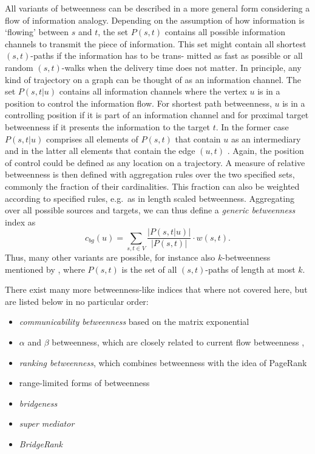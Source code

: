 \documentclass[]{book}
\providecommand{\tightlist}{%
  \setlength{\itemsep}{0pt}\setlength{\parskip}{0pt}}
\theoremstyle{definition}
\theoremstyle{definition}
\theoremstyle{definition}
\theoremstyle{remark}
\begin{document}
All variants of betweenness can be described in a more general form
considering a flow of information analogy. Depending on the assumption
of how information is `flowing' between \(s\) and \(t\), the set
\(P(s, t)\) contains all possible information channels to transmit the
piece of information. This set might contain all shortest
\(( s, t )\)-paths if the information has to be trans- mitted as fast as
possible or all random \((s, t)\)-walks when the delivery time does not
matter. In principle, any kind of trajectory on a graph can be thought
of as an information channel. The set \(P( s, t \lvert u )\) contains
all information channels where the vertex \(u\) is in a position to
control the information flow. For shortest path betweenness, \(u\) is in
a controlling position if it is part of an information channel and for
proximal target betweenness if it presents the information to the target
\(t\). In the former case \(P( s, t \lvert u )\) comprises all elements
of \(P(s, t)\) that contain \(u\) as an intermediary and in the latter
all elements that contain the edge \((u,t)\) . Again, the position of
control could be defined as any location on a trajectory. A measure of
relative betweenness is then defined with aggregation rules over the two
specified sets, commonly the fraction of their cardinalities. This
fraction can also be weighted according to specified rules, e.g.~as in
length scaled betweenness. Aggregating over all possible sources and
targets, we can thus define a \emph{generic betweenness} index as \[
c_{bg}(u) = \sum\limits_{s,t \in V}\frac{\lvert P(s,t\lvert u) \rvert}{\lvert P(s,t) \rvert} \cdot w(s,t).
\] Thus, many other variants are possible, for instance also
\(k\)-betweenness mentioned by \citet{be-gpc-06}, where \(P( s, t )\) is
the set of all \(( s, t )\)-paths of length at most \(k\).

There exist many more betweenness-like indices that where not covered
here, but are listed below in no particular order:

\begin{itemize}
\tightlist
\item
  \emph{communicability betweenness} based on the matrix exponential
  \citep{ehh-cbcn-09}
\item
  \(\alpha\) and \(\beta\) betweenness, which are closely related to
  current flow betweenness \citep{alms-acfbc-13, amt-bcfcwn-15},
\item
  \emph{ranking betweenness}, which combines betweenness with the idea
  of PageRank \citep{aotv-nbcmbarnn-14}
\item
  range-limited forms of betweenness \citep{elct-rcmcn-12}
\item
  \emph{bridgeness} \citep{jmkvvjcmf-dgbn-16}
\item
  \emph{super mediator} \citep{skom-sm-ncmniidsn-16}
\item
  \emph{BridgeRank} \citep{sam-bnfcmblsn-18}
\end{itemize}
\end{document}

